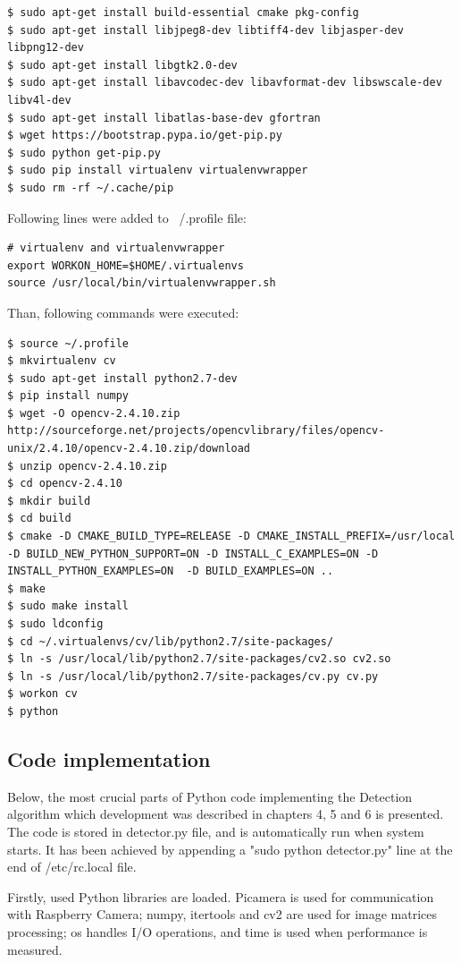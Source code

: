 \documentclass[12pt,twoside,a4paper]{article}
\begin{document}
\begin{lstlisting}
$ sudo apt-get install build-essential cmake pkg-config
$ sudo apt-get install libjpeg8-dev libtiff4-dev libjasper-dev libpng12-dev
$ sudo apt-get install libgtk2.0-dev
$ sudo apt-get install libavcodec-dev libavformat-dev libswscale-dev libv4l-dev
$ sudo apt-get install libatlas-base-dev gfortran
$ wget https://bootstrap.pypa.io/get-pip.py
$ sudo python get-pip.py
$ sudo pip install virtualenv virtualenvwrapper
$ sudo rm -rf ~/.cache/pip
\end{lstlisting}
Following lines were added to ~/.profile file:
\begin{lstlisting}
# virtualenv and virtualenvwrapper
export WORKON_HOME=$HOME/.virtualenvs
source /usr/local/bin/virtualenvwrapper.sh
\end{lstlisting}
Than, following commands were executed:
\begin{lstlisting}
$ source ~/.profile
$ mkvirtualenv cv
$ sudo apt-get install python2.7-dev
$ pip install numpy
$ wget -O opencv-2.4.10.zip http://sourceforge.net/projects/opencvlibrary/files/opencv-unix/2.4.10/opencv-2.4.10.zip/download
$ unzip opencv-2.4.10.zip
$ cd opencv-2.4.10
$ mkdir build
$ cd build
$ cmake -D CMAKE_BUILD_TYPE=RELEASE -D CMAKE_INSTALL_PREFIX=/usr/local -D BUILD_NEW_PYTHON_SUPPORT=ON -D INSTALL_C_EXAMPLES=ON -D INSTALL_PYTHON_EXAMPLES=ON  -D BUILD_EXAMPLES=ON ..
$ make
$ sudo make install
$ sudo ldconfig
$ cd ~/.virtualenvs/cv/lib/python2.7/site-packages/
$ ln -s /usr/local/lib/python2.7/site-packages/cv2.so cv2.so
$ ln -s /usr/local/lib/python2.7/site-packages/cv.py cv.py
$ workon cv
$ python
\end{lstlisting}

\subsection{Code implementation}

Below, the most crucial parts of Python code implementing the Detection algorithm which development was described in chapters 4, 5 and 6 is presented.
The code is stored in detector.py file, and is automatically run when system starts. It has been achieved by appending a "sudo python detector.py" line at the end of /etc/rc.local file.


Firstly, used Python libraries are loaded. Picamera is used for communication with Raspberry Camera; numpy, itertools and cv2 are used for image matrices processing; os handles I/O operations, and time is used when performance is measured.
\end{document}
